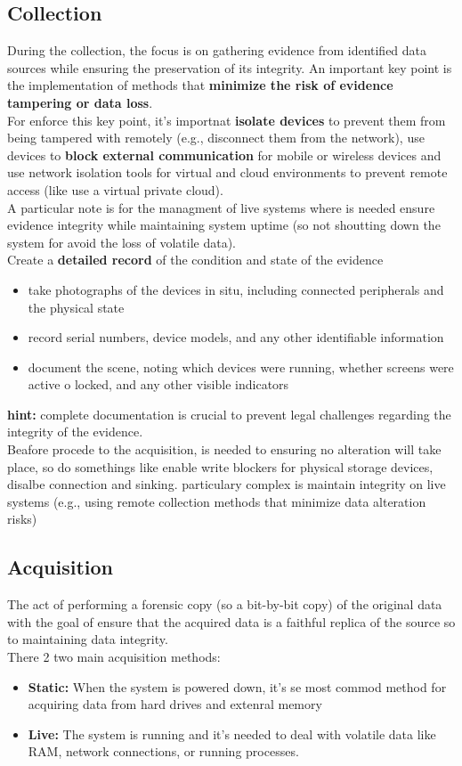 \subsection{Collection}
During the collection, the focus is on gathering evidence from identified data sources while ensuring the preservation of its integrity. An important key point is the implementation of methods that \textbf{minimize the risk of evidence tampering or data loss}. \\
For enforce this key point, it's importnat \textbf{isolate devices} to prevent them from being tampered with remotely (e.g., disconnect them from the network), use devices to \textbf{block external
communication} for mobile or wireless devices and use network isolation tools for virtual and cloud environments to prevent remote access (like use a virtual private cloud). \\
A particular note is for the managment of live systems where is needed ensure evidence integrity while
maintaining system uptime (so not shoutting down the system for avoid the loss of volatile data). \\
Create a \textbf{detailed record} of the condition and state of the evidence
\begin{itemize}[itemsep=0pt]
    \item take photographs of the devices in situ, including connected peripherals and the physical state
    \item  record serial numbers, device models, and any other identifiable information
    \item  document the scene, noting which devices were running, whether screens were active o locked, and any other visible indicators
\end{itemize}
\textbf{hint:} complete documentation is crucial to prevent legal challenges regarding the integrity of the evidence. \\
Beafore procede to the acquisition, is needed to ensuring no alteration will take place, so do somethings like enable write blockers for physical storage devices, disalbe connection and sinking. particulary complex is maintain  integrity on live systems (e.g., using remote collection methods that minimize data alteration risks)


\subsection{Acquisition}
The act of performing a forensic copy (so a bit-by-bit copy) of the original data with the goal of ensure that the acquired data is a faithful replica of the source so to maintaining data integrity. \\
There 2 two main acquisition methods:
\begin{itemize}
    \item \textbf{Static:} When the system is powered down, it's se most commod method for acquiring data from hard drives and extenral memory
    \item \textbf{Live:} The system is running and it's needed to deal with volatile data like RAM, network connections, or running processes.
\end{itemize} 

